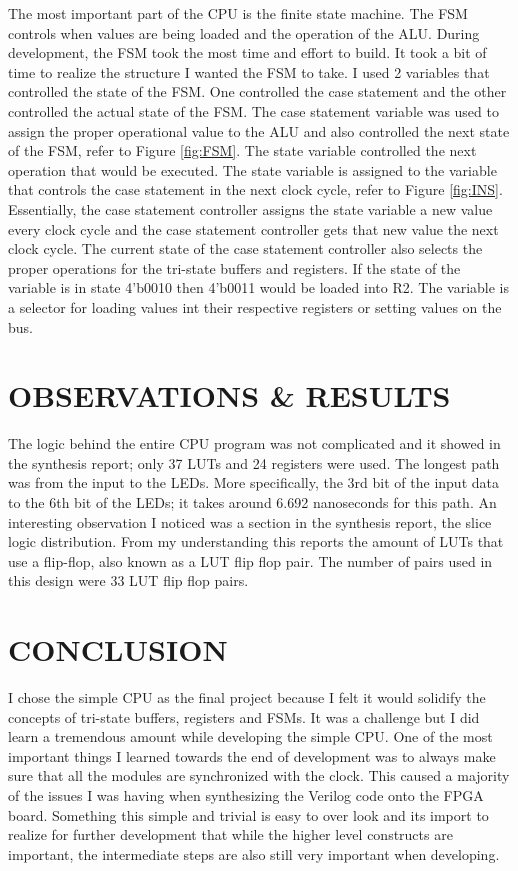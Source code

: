 \documentclass[10pt,conference]{ieeeconf}
\begin{document}
	The most important part of the CPU is the finite state machine. The FSM controls when values are being loaded and the operation of the ALU. During development, the FSM took the most time and effort to build. It took a bit of time to realize the structure I wanted the FSM to take. I used 2 variables that controlled the state of the FSM. One controlled the case statement and the other controlled the actual state of the FSM. The case statement variable was used to assign the proper operational value to the ALU and also controlled the next state of the FSM, refer to Figure \ref{fig:FSM}. The state variable controlled the next operation that would be executed. The state variable is assigned to the variable that controls the case statement in the next clock cycle, refer to Figure \ref{fig:INS}. Essentially, the case statement controller assigns the state variable a new value every clock cycle and the case statement controller gets that new value the next clock cycle. The current state of the case statement controller also selects the proper operations for the tri-state buffers and registers. If the state of the variable is in state 4'b0010 then 4'b0011 would be loaded into R2. The variable is a selector for loading values int their respective registers or setting values on the bus.


\section{OBSERVATIONS \& RESULTS}
	The logic behind the entire CPU program was not complicated and it showed in the synthesis report; only 37 LUTs and 24 registers were used. The longest path was from the input to the LEDs. More specifically, the 3rd bit of the input data to the 6th bit of the LEDs; it takes around 6.692 nanoseconds for this path. An interesting observation I noticed was a section in the synthesis report, the slice logic distribution. From my understanding this reports the amount of LUTs that use a flip-flop, also known as a LUT flip flop pair. The number of pairs used in this design were 33 LUT flip flop pairs.

\section{CONCLUSION}
	I chose the simple CPU as the final project because I felt it would solidify the concepts of tri-state buffers, registers and FSMs. It was a challenge but I did learn a tremendous amount while developing the simple CPU. One of the most important things I learned towards the end of development was to always make sure that all the modules are synchronized with the clock. This caused a majority of the issues I was having when synthesizing the Verilog code onto the FPGA board. Something this simple and trivial is easy to over look and its import to realize for further development that while the higher level constructs are important, the intermediate steps are also still very important when developing.

\end{document}
